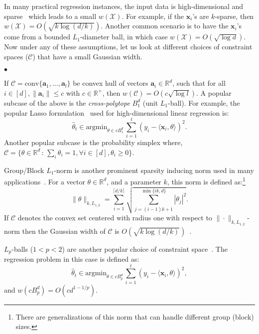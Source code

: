 \documentclass{article}
\theoremstyle{plain}
\newenvironment{CompactItemize}{
\begin{list}{$\bullet$}{%
\setlength{\leftmargin}{12pt}
\setlength{\itemindent}{1pt}
\setlength{\topsep}{1pt}
\setlength{\itemsep}{-1pt}
}}
{\end{list}}
\def \CCC {\mathcal{C}}
\def \XXX {\mathcal{X}}
\def \a {\mathbf a}
\def \x {\mathbf x}
\def \R {\mathbb{R}}
\begin{document}
In many practical regression instances, the input data is high-dimensional and sparse~\cite{nelson2013osnap,halko2011finding,zhou2008compressed} which leads to a small $w(\XXX)$. For example, if the $\x_i$'s are $k$-sparse, then $w(\XXX) = O(\sqrt{k \log(d/k)})$. Another common scenario is to have the $\x_i$'s come from a bounded $L_1$-diameter ball, in which case $w(\XXX)= O(\sqrt{\log d})$. Now under any of these assumptions, let us look at different choices of constraint spaces ($\CCC$) that have a small Gaussian width.

\begin{CompactItemize}
\item If $\CCC=\mathrm{conv}\{\a_1,\dots,\a_l\}$ be convex hull of vectors $\a_i \in \R^d$, such that for all $i \in [d], \| \a_i \| \leq c$ with $c \in \R^+$, then $w(\CCC) = O(c \sqrt{\log l})$. A popular subcase of the above is the {\em cross-polytope} $B_1^d$ (unit $L_1$-ball). For example, the popular Lasso formulation~\cite{tibshirani1996regression} used for high-dimensional linear regression is:
$$\hat{\theta}_t \in \mbox{argmin}_{\theta \in c B_1^d}\, \sum_{i=1}^t (y_i - \langle \x_i, \theta \rangle)^2.$$
Another popular subcase is the probability simplex where, $\CCC = \{ \theta \in \R^d \,:\, \sum_{i} \theta_i = 1, \forall i \in [d], \theta_i \geq 0 \}$.

\item Group/Block $L_1$-norm is another prominent sparsity inducing norm used in many applications~\cite{bach2012optimization}. For a vector $\theta \in \R^d$, and a parameter $k$, this norm is defined as:\!\footnote{There are generalizations of this norm that can handle different group (block) sizes.}
$$\|\theta\|_{k,L_{1,2}} = \sum_{i=1}^{\lceil d/k \rceil} \sqrt{\sum_{j=(i-1)k+1}^{\min\{ik, d\}} |\theta_j|^2}.$$
If $\CCC$ denotes the convex set centered with radius one with respect to $\|\cdot\|_{k,L_{1,2}}$-norm then the Gaussian width of $\CCC$ is $O(\sqrt{k\log(d/k)})$~\cite{talwar2014private}.

\item $L_p$-balls ($1 < p < 2$) are another popular choice of constraint space~\cite{rahimi2013norm}. The regression problem in this case is defined as:
$$\hat{\theta}_t \in \mbox{argmin}_{\theta \in c B_p^d}\, \sum_{i=1}^t (y_i - \langle \x_i, \theta \rangle)^2,$$
and $w(c B_p^d) = O(cd^{1-1/p})$.
\end{CompactItemize}
\end{document}
